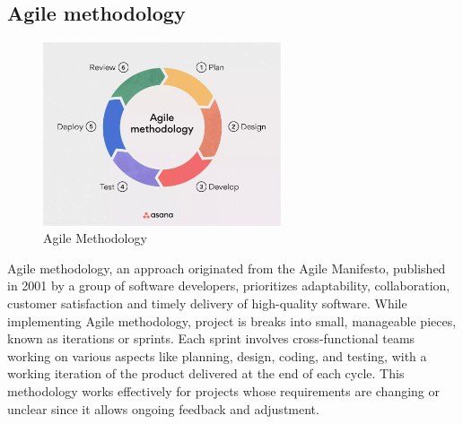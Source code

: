 \subsection{Agile methodology}
\begin{figure}[!ht]
    \centering
    \includegraphics[width=7cm]{Images/agile.png}
    \caption{Agile Methodology \citep{laoyan_2022_what}}
    \label{fig:agile}
\end{figure}
Agile methodology, an approach originated from the Agile Manifesto, published in 2001 by a group of software developers, prioritizes adaptability, collaboration, customer satisfaction and timely delivery of high-quality software.
While implementing Agile methodology, project is breaks into small, manageable pieces, known as iterations or sprints.
Each sprint involves cross-functional teams working on various aspects like planning, design, coding, and testing, with a working iteration of the product delivered at the end of each cycle. 
This methodology works effectively for projects whose requirements are changing or unclear since it allows ongoing feedback and adjustment. 

